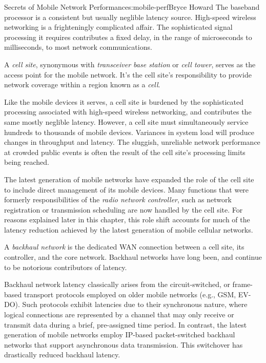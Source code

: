 \begin{aosachapter}{Secrets of Mobile Network Performance}{s:mobile-perf}{Bryce Howard}
The baseband processor is a consistent but usually neglible latency
source. High-speed wireless networking is a frighteningly complicated
affair. The sophisticated signal processing it requires contributes a
fixed delay, in the range of microseconds to milliseconds, to most
network communications.


A \emph{cell site}, synonymous with \emph{transceiver base station} or
\emph{cell tower}, serves as the access point for the mobile network.
It's the cell site's responsibility to provide network coverage within a
region known as a \emph{cell}.

Like the mobile devices it serves, a cell site is burdened by the
sophisticated processing associated with high-speed wireless networking,
and contributes the same mostly neglible latency. However, a cell site
must simultaneously service hundreds to thousands of mobile devices.
Variances in system load will produce changes in throughput and latency.
The sluggish, unreliable network performance at crowded public events is
often the result of the cell site's processing limits being reached.

The latest generation of mobile networks have expanded the role of the
cell site to include direct management of its mobile devices. Many
functions that were formerly responsibilities of the \emph{radio network
controller}, such as network registration or transmission scheduling are
now handled by the cell site. For reasons explained later in this
chapter, this role shift accounts for much of the latency reduction
achieved by the latest generation of mobile cellular networks.


A \emph{backhaul network} is the dedicated WAN connection between a cell
site, its controller, and the core network. Backhaul networks have long
been, and continue to be notorious contributors of latency.

Backhaul network latency classically arises from the circuit-switched,
or frame-based transport protocols employed on older mobile networks
(e.g., GSM, EV-DO). Such protocols exhibit latencies due to their
synchronous nature, where logical connections are represented by a
channel that may only receive or transmit data during a brief,
pre-assigned time period. In contrast, the latest generation of mobile
networks employ IP-based packet-switched backhaul networks that support
asynchronous data transmission. This switchover has drastically reduced
backhaul latency.


\end{aosachapter}
